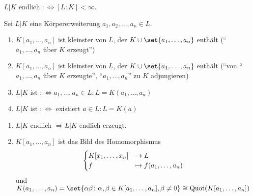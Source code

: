 \begin{definition}
	$L\vert K$ endlich $:\Leftrightarrow [L:K] < \infty$.
\end{definition}


\begin{definition}
	Sei $L\vert K$ eine Körpererweiterung $a_1, a_2, \dots, a_n \in L$.
	\begin{enumerate}
		\item $K[a_1, \dots, a_n]$ ist kleinster  von $L$, der $K \cup \set{a_1, \dots, a_n}$ enthält (``$a_1, \dots, a_n$ über $K$ erzeugt'')
		\item $K[a_1, \dots, a_n]$ ist kleinster  von $L$, der $K \cup \set{a_1, \dots, a_n}$ enthält (``von ``$a_1, \dots, a_n$ über $K$ erzeugte'', ``$a_1, \dots, a_n$'' zu $K$ adjungieren)
		\item $L | K$ ist  $:\Leftrightarrow a_1, \dots , a_n \in L : L=K(a_1, \dots, a_n)$
		\item $L | K$ ist  $:\Leftrightarrow$ existiert $a \in L: L=K(a)$  
	\end{enumerate}
\end{definition}

\begin{remark}
	\begin{enumerate}[label=(\alph*)]
		\item $L\vert K$ endlich $\Rightarrow L\vert K$ endlich erzeugt.
		\item $K[a_1, \dots, a_n]$ ist das Bild des Homomorphismus
		\begin{align}
		\begin{cases}
		K[x_1, \dots, x_n] &\to L\\
		f &\mapsto f(a_1, \dots, a_n)
		\end{cases}\notag
		\end{align}
		und $K(a_1, \dots , a_n) = \set{\alpha \beta \colon \alpha, \beta \in K[a_1, \dots, a_n], \beta \neq 0} \cong \Quot(K[a_1, \dots, a_n])$
	\end{enumerate}
\end{remark}